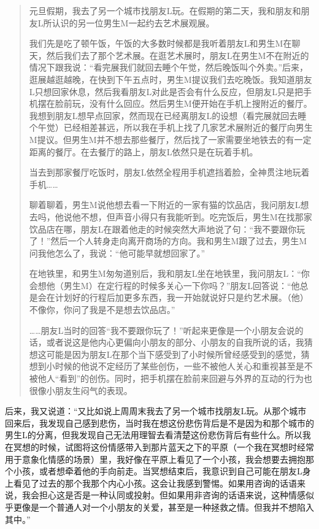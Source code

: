 \blockquote{
元旦假期，我去了另一个城市找朋友L玩。在假期的第二天，我和朋友和朋友L所认识的另一位男生M一起约去艺术展观展。

我们先是吃了顿午饭，午饭的大多数时候都是我听着朋友L和男生M在聊天，然后我们去了那个艺术展。在逛艺术展时，朋友L在男生M不在附近的情况下跟我说：“看完展我们就回去睡个午觉，然后晚饭叫个外卖。”后来，逛展越逛越晚，在快到下午五点时，男生M提议我们去吃晚饭。我知道朋友L只想回家休息，然后我看朋友L对此是否会有什么反应，但朋友L只是把手机摆在脸前玩，没有什么回应。然后男生M便开始在手机上搜附近的餐厅。我想到朋友L想早点回家，然而现在已经离朋友L的设想（看完展就回去睡个午觉）已经相差甚远，所以我在手机上找了几家艺术展附近的餐厅向男生M提议。但男生M并不想去那些餐厅，然后找了一家需要坐地铁去的有一定距离的餐厅。在去餐厅的路上，朋友L依然只是在玩着手机。

当去到那家餐厅吃饭时，朋友L依然全程用手机遮挡着脸，全神贯注地玩着手机……

聊着聊着，男生M说他想去看一下附近的一家有猫的饮品店，我问朋友L想去吗，他说他不想，但声音小得只有我能听到。吃完饭后，男生M在找那家饮品店在哪，朋友L在跟着他走的时候突然大声地说了句：“我不要跟你玩了！”然后一个人转身走向离开商场的方向。我和男生M跟了过去，男生M问我他怎么了，我说：“他可能早就想回家了。”

在地铁里，和男生M匆匆道别后，我和朋友L坐在地铁里，我问朋友L：“你会想他（男生M）在定行程的时候多关心一下你吗？”朋友L回答说：“他总是会在计划好的行程后加更多东西，我一开始就说好只是约艺术展。（他）不像你，你问了我是不是想去饮品店。”

……朋友L当时的回答“我不要跟你玩了！”听起来更像是一个小朋友会说的话，或者说这是他内心更偏向小朋友的部分、小朋友的自我所说的话，我猜想这可能是因为朋友L在那个当下感受到了小时候所曾经感受到的感觉，猜想到小时候的他说不定经历了某些创伤，一些不被他人关心和重视甚至是不被他人“看到”的创伤。同时，把手机摆在脸前来回避与外界的互动的行为也很像小朋友生闷气的表现。

}

后来，我又说道：“又比如说上周周末我去了另一个城市找朋友L玩。从那个城市回来后，我发现自己感到悲伤，当时我在想这份悲伤背后是不是因为和那个城市的男生L的分离，但我发现自己无法用理智去看清楚这份悲伤背后有些什么。所以我在冥想的时候，试图将这份情感带入到那片蓝天之下的平原（一个我在冥想时经常用于意象化情感的场景）里，我好像在平原上看见了一个小孩，我会想要去拥抱那个小孩，或者想牵着他的手向前走。当冥想结束后，我意识到自己可能在朋友L身上看见了过去的那个我\pozhehao{}那个内心小孩。这会让我感到警惕。如果用咨询的话语来说，我会担心这是否是一种认同或投射。但如果用非咨询的话语来说，这种情感似乎更像是一个普通人对一个小朋友的关爱，甚至是一种拯救之情。但我并不想陷入其中。”

